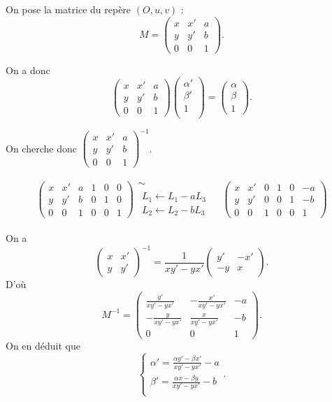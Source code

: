 On pose la matrice du repère $(O, u, v)$ :  \[
	M = \begin{pmatrix}
		x&x'&a\\
		y&y'&b\\
		0&0&1
	\end{pmatrix} 
.\]

On a donc \[
	\begin{pmatrix}
		x&x'&a\\
		y&y'&b\\
		0&0&1
	\end{pmatrix} \begin{pmatrix}
		\alpha'\\
		\beta'\\
		1\\
	\end{pmatrix} = \begin{pmatrix}
		\alpha\\
		\beta\\
		1
	\end{pmatrix}
.\]

On cherche donc $\begin{pmatrix}
	x&x'&a\\
	y&y'&b\\
	0&0&1
\end{pmatrix}^{-1}$.

\begin{align*}
	\left(
		\begin{array}{ccc|ccc}
			x&x'&a&1&0&0\\
			y&y'&b&0&1&0\\
			0&0&1&0&0&1
		\end{array}
	\right)
	\begin{array}{c}
		\sim\\
		\substack{L_1 \leftarrow L_1 - aL_3\\L_2\leftarrow L_2-bL_3}
	\end{array}&
	\left(
		\begin{array}{ccc|ccc}
			x&x'&0&1&0&-a\\
			y&y'&0&0&1&-b\\
			0&0&1&0&0&1
		\end{array}
	\right)
\end{align*}

On a \[
	\begin{pmatrix}
		x&x'\\
		y&y'
	\end{pmatrix}^{-1} = \frac{1}{xy'-yx'} \begin{pmatrix}
		y'&-x'\\
		-y&x
	\end{pmatrix}
.\] D'où \[
	M^{-1} = \begin{pmatrix}
		\frac{y'}{xy' - yx'}&-\frac{x'}{xy' - yx'}&-a\\
		-\frac{y}{xy'-yx'}&\frac{x}{xy'-yx'}&-b\\
		0&0&1
	\end{pmatrix} 
.\] On en déduit que \[
	\begin{cases}
		\alpha' = \frac{\alpha y' - \beta x'}{xy' - yx'} - a\\[2mm]
		\beta' = \frac{\alpha x - \beta y}{xy' - yx'} - b\\
	\end{cases}
.\]
